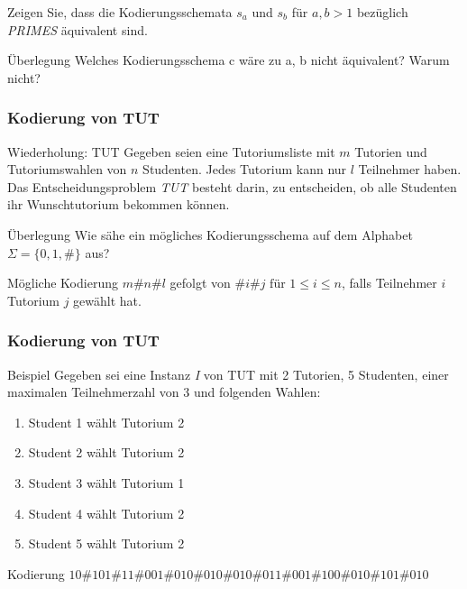\documentclass{beamer}
\begin{document}
{\begin{frame}
Zeigen Sie, dass die Kodierungsschemata $s_a$ und $s_b$ für $a,b>1$ bezüglich \textit{PRIMES} äquivalent sind.

\begin{block}{Überlegung}
 Welches Kodierungsschema c wäre zu a, b nicht äquivalent? Warum nicht?
\end{block}
\end{frame}

\begin{frame}
\frametitle{Kodierung von TUT}
 \begin{block}{Wiederholung: TUT}
  Gegeben seien eine Tutoriumsliste mit $m$ Tutorien und Tutoriumswahlen von $n$ Studenten. Jedes Tutorium kann nur $l$ Teilnehmer haben.
 Das Entscheidungsproblem \textit{TUT} besteht darin, zu entscheiden, ob alle Studenten ihr Wunschtutorium bekommen können.
 \end{block}
 \begin{block}{Überlegung}
 Wie sähe ein mögliches Kodierungsschema auf dem Alphabet $\Sigma = \{0,1,\#\}$ aus?
 \end{block}
 \pause
 \begin{block}{Mögliche Kodierung}
 $m\#n\#l$ gefolgt von $\#i\#j \mbox{ für } 1 \leq i \leq n$, falls Teilnehmer $i$ Tutorium $j$ gewählt hat.
 \end{block}
\end{frame}

\begin{frame}
\frametitle{Kodierung von TUT}
\begin{block}{Beispiel}
 Gegeben sei eine Instanz \textit{I} von TUT mit 2 Tutorien, 5 Studenten, einer maximalen Teilnehmerzahl von 3 und folgenden Wahlen:
 \begin{enumerate}
  \item Student 1 wählt Tutorium 2
  \item Student 2 wählt Tutorium 2
  \item Student 3 wählt Tutorium 1
  \item Student 4 wählt Tutorium 2
  \item Student 5 wählt Tutorium 2
 \end{enumerate}
\end{block}
\pause
\begin{block}{Kodierung}
$10\#101\#11 \#001\#010 \#010\#010 \#011\#001 \#100\#010 \#101\#010$
\end{block}
\end{frame}

}
\end{document}
